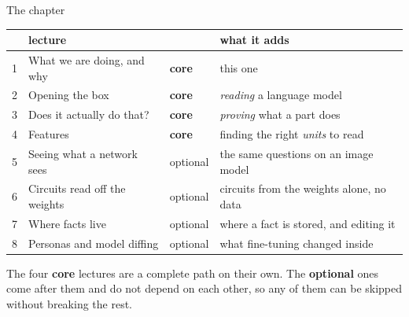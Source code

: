 \documentclass[aspectratio=169]{beamer}
\newcommand{\keybox}[1]{%
  \begin{tcolorbox}[colback=armblue!8, colframe=armblue, boxrule=0.6pt, arc=2pt]
  #1
  \end{tcolorbox}}
\begin{document}
\begin{frame}{The chapter}
  \vspace{-0.1em}
  \begin{center}
  \small
  \begin{tabular}{@{}rp{}lp{}@{}}
    \toprule
    & \textbf{lecture} & & \textbf{what it adds}\\
    \midrule
    1 & What we are doing, and why & \textcolor{popblue}{\textbf{core}} & this one\\
    2 & Opening the box & \textcolor{popblue}{\textbf{core}} & \emph{reading} a language model\\
    3 & Does it actually do that? & \textcolor{popblue}{\textbf{core}} & \emph{proving} what a part does\\
    4 & Features & \textcolor{popblue}{\textbf{core}} & finding the right \emph{units} to read\\
    \midrule
    5 & Seeing what a network sees & \textcolor{armorange}{optional} & the same questions on an image model\\
    6 & Circuits read off the weights & \textcolor{armorange}{optional} & circuits from the weights alone, no data\\
    7 & Where facts live & \textcolor{armorange}{optional} & where a fact is stored, and editing it\\
    8 & Personas and model diffing & \textcolor{armorange}{optional} & what fine-tuning changed inside\\
    \bottomrule
  \end{tabular}
  \end{center}

  \vspace{0.4em}
  \keybox{\small The four \textbf{core} lectures are a complete path on their own. The
  \textbf{optional} ones come after them and do not depend on each other, so any of them can be
  skipped without breaking the rest.}
\end{frame}
\end{document}
